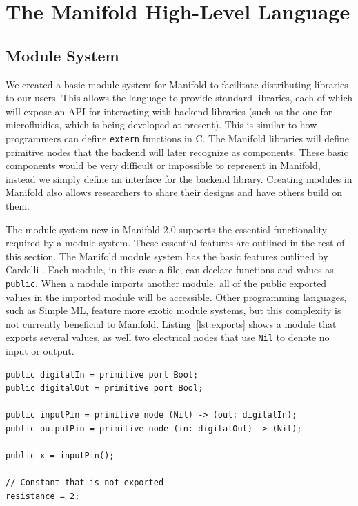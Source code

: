 \section{The Manifold High-Level Language}

\subsection{Module System}

We created a basic module system for Manifold to facilitate
distributing libraries to our users. This allows the language to provide standard
libraries, each of which will expose an API for interacting with backend
libraries (such as the one for microfluidics, which is being developed at present). This is similar to how programmers can define
\texttt{extern} functions in C. The Manifold libraries will define primitive
nodes that the backend will later recognize as components. These basic
components would be very difficult or impossible to represent in Manifold,
instead we simply define an interface for the backend library. Creating
modules in Manifold also allows researchers to share their designs and have
others build on them.

The module system new in Manifold 2.0 supports the essential functionality required by a module system. These
essential features are outlined in the rest of this section.
The Manifold module system has the basic features outlined by Cardelli
\cite{Cardelli:1997:PFL:263699.263735}. Each module, in this case a file, can
declare functions and values as \texttt{public}. When a module imports another
module, all of the public exported values in the imported module will be
accessible. Other programming languages, such as Simple ML, feature more exotic module systems, but this complexity
is not currently beneficial to Manifold. Listing~\ref{lst:exports} shows a module that exports several values, as well two
electrical nodes that use \texttt{Nil} to denote no input or output.

\begin{lstlisting}[label=lst:exports, caption=Exported values in a Manifold file]
public digitalIn = primitive port Bool;
public digitalOut = primitive port Bool;

public inputPin = primitive node (Nil) -> (out: digitalIn);
public outputPin = primitive node (in: digitalOut) -> (Nil);

public x = inputPin();

// Constant that is not exported
resistance = 2;
\end{lstlisting}

